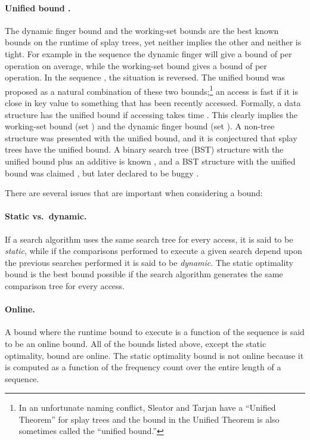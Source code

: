 \documentclass{llncs}
\begin{document}
\paragraph{Unified bound \cite{DBLP:journals/tcs/BadoiuCDI07}.} The dynamic finger bound and the working-set bounds are the best known bounds on the runtime of splay trees, yet neither implies the other and neither is tight. For example in the sequence  the dynamic finger will give a bound of  per operation on average, while the working-set bound gives a bound of  per operation. In the sequence , the situation is reversed.  The unified bound was proposed as a natural combination of these two bounds;\footnote{In an unfortunate naming conflict, Sleator and Tarjan have a ``Unified Theorem'' for splay trees \cite[Theorem~5]{DBLP:journals/jacm/SleatorT85} and the bound in the Unified Theorem is also sometimes called the ``unified bound.''} 
an access is fast if it is close in key value to something that has been recently accessed. Formally, a data structure has the unified bound if accessing  takes time . This clearly implies the working-set bound (set ) and the dynamic finger bound (set ). A non-tree structure was presented with the unified bound, and it is conjectured that splay trees have the unified bound. A binary search tree (BST) structure with the unified bound plus an additive  is known \cite{DBLP:conf/wads/DerryberryS09}, and a BST structure with the unified bound was claimed \cite{dthesis}, but later declared to be buggy \cite{wrong}.

\noindent
There are several issues that are important when considering a bound:

\paragraph{Static vs.~dynamic.} If a search algorithm uses the same search tree for every access, it is said to be \emph{static}, while if the comparisons performed to execute a given search depend upon the previous searches performed it is said to be \emph{dynamic}. The static optimality bound is the best bound possible if the search algorithm generates the same comparison tree for every access.

\paragraph{Online.} A bound where the runtime bound to execute  is a function of the sequence  is said to be an online bound. All of the bounds listed above, except the static optimality, bound are online. The static optimality bound is not online because it is computed as a function of the frequency count over the entire length of a sequence.
\end{document}
